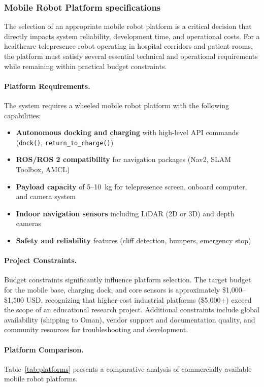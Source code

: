 \subsubsection{Mobile Robot Platform specifications}

The selection of an appropriate mobile robot platform is a critical decision that directly impacts system reliability, development time, and operational costs. For a healthcare telepresence robot operating in hospital corridors and patient rooms, the platform must satisfy several essential technical and operational requirements while remaining within practical budget constraints.

\paragraph{Platform Requirements.}
The system requires a wheeled mobile robot platform with the following capabilities:

\begin{itemize}[leftmargin=*]
    \item \textbf{Autonomous docking and charging} with high-level API commands (\texttt{dock()}, \texttt{return\_to\_charge()})
    \item \textbf{ROS/ROS 2 compatibility} for navigation packages (Nav2, SLAM Toolbox, AMCL)
    \item \textbf{Payload capacity} of 5--10~kg for telepresence screen, onboard computer, and camera system
    \item \textbf{Indoor navigation sensors} including LiDAR (2D or 3D) and depth cameras
    \item \textbf{Safety and reliability} features (cliff detection, bumpers, emergency stop)
\end{itemize}

\paragraph{Project Constraints.}
Budget constraints significantly influence platform selection. The target budget for the mobile base, charging dock, and core sensors is approximately \$1,000--\$1,500 USD, recognizing that higher-cost industrial platforms (\$5,000+) exceed the scope of an educational research project. Additional constraints include global availability (shipping to Oman), vendor support and documentation quality, and community resources for troubleshooting and development.

\paragraph{Platform Comparison.}
Table~\ref{tab:platforms} presents a comparative analysis of commercially available mobile robot platforms. 

